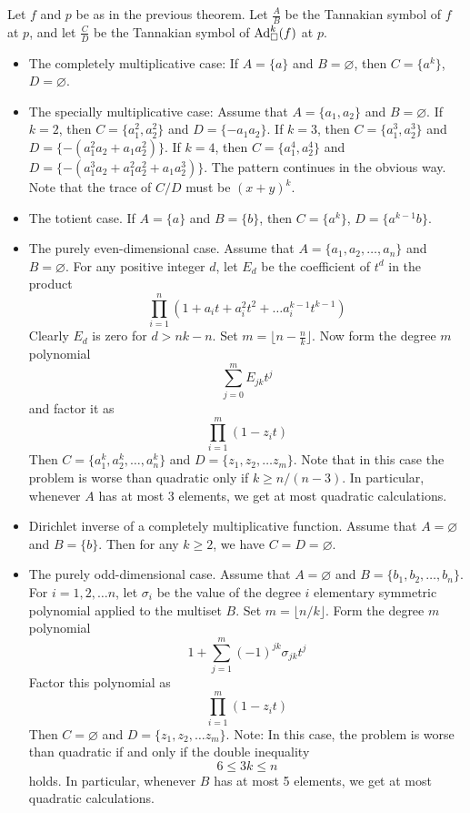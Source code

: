 \begin{corollary}
Let $f$ and $p$ be as in the previous theorem. Let $\frac{A}{B}$ be the Tannakian symbol of $f$ at $p$, and let $\frac{C}{D}$ be the Tannakian symbol of $\text{Ad}^{k}_{\square}(f)$ at $p$.
\begin{itemize}
\item The completely multiplicative case: If $A = \{a \}$ and $B = \varnothing$, then $C =  \{a^k \}$, $D = \varnothing$. 
\item The specially multiplicative case: Assume that $A = \{ a_1, a_2 \}$ and $B = \varnothing$. If $k=2$, then $C = \{ a_1^2, a_2^2  \}$ and $D = \{ -a_1 a_2 \}$. If $k=3$, then $C = \{ a_1^3, a_2^3  \}$ and $D = \{ -(a_1^2 a_2 + a_1 a_2^2) \}$. If $k = 4$, then $C = \{ a_1^4, a_2^4  \}$ and $D = \{ -(a_1^3 a_2 + a_1^2 a_2^2 + a_1 a_2^3) \}$. The pattern continues in the obvious way. Note that the trace of $C/D$ must be $(x+y)^k$.
\item The totient case. If $A = \{a \}$ and $B = \{b \}$, then $C =  \{a^k \}$, $D = \{   a^{k-1} b \}$. 

\item The purely even-dimensional case. Assume that $A = \{ a_1, a_2, \ldots, a_n \}$ and $B = \varnothing$. For any positive integer $d$, let $E_d$ be the coefficient of $t^d$ in the product
$$ \prod_{i=1}^n ( 1+a_i t + a_i^2 t^2 + \ldots a_i^{k-1} t^{k-1} )    $$
Clearly $E_d$ is zero for $d > nk-n$. Set $m = \lfloor n- \frac{n}{k} \rfloor$. Now form the degree $m$ polynomial
$$ \sum_{j = 0}^m E_{jk} t^j   $$
and factor it as 
$$ \prod_{i=1}^m (1-z_i t)  $$
Then $C = \{ a_1^k, a_2^k, \ldots, a_n^k \}$ and $D = \{ z_1, z_2, \ldots z_m \}$.
Note that in this case the problem is worse than quadratic only if $k \geq n / (n-3)$. In particular, whenever $A$ has at most 3 elements, we get at most quadratic calculations.

\item Dirichlet inverse of a completely multiplicative function. Assume that $A = \varnothing$ and $B = \{ b \}$. Then for any $k \geq 2$, we have $C = D = \varnothing$.

\item The purely odd-dimensional case. Assume that $A = \varnothing$ and $B = \{ b_1, b_2, \ldots, b_n \}$. For $i = 1, 2, \ldots n$, let $\sigma_i$ be the value of the degree $i$ elementary symmetric polynomial applied to the multiset $B$. Set $m = \lfloor n/k \rfloor$. Form the degree $m$ polynomial 
$$ 1+ \sum_{j=1}^{m} (-1)^{jk} \sigma_{jk} t^j   $$ 
Factor this polynomial as 
$$ \prod_{i=1}^m (1-z_i t)  $$
Then $C = \varnothing$ and $D = \{ z_1, z_2, \ldots z_m  \}$.
Note: In this case, the problem is worse than quadratic if and only if the double inequality
$$ 6 \leq 3k \leq n   $$
holds. In particular, whenever $B$ has at most 5 elements, we get at most quadratic calculations. 
\end{itemize}
\end{corollary}
